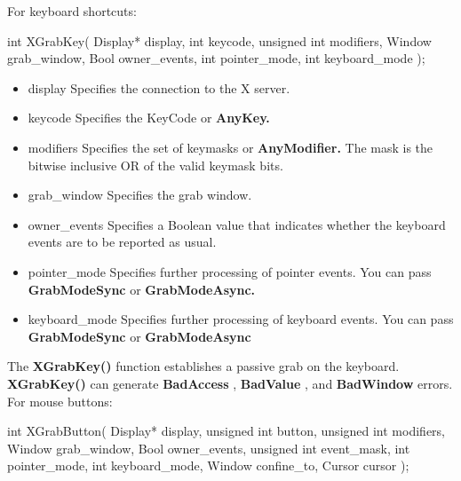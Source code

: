 \documentclass{report}
\begin{document}
\begin{itemize}
            \bigbreak \noindent 
            For keyboard shortcuts:
            \bigbreak \noindent 
            \begin{cppcode}
                int XGrabKey(
                    Display* display,
                    int keycode,
                    unsigned int modifiers,
                    Window grab_window,
                    Bool owner_events,
                    int pointer_mode,
                    int keyboard_mode
                );
            \end{cppcode}
            \bigbreak \noindent
            \begin{itemize}
                \item display	Specifies the connection to the X server.
                \item keycode	Specifies the KeyCode or \textbf{AnyKey.}
                \item modifiers	Specifies the set of keymasks or \textbf{AnyModifier.} The mask is the bitwise inclusive OR of the valid keymask bits.
                \item grab\_window	Specifies the grab window.
                \item owner\_events	Specifies a Boolean value that indicates whether the keyboard events are to be reported as usual.
                \item pointer\_mode	Specifies further processing of pointer events. You can pass \textbf{GrabModeSync} or \textbf{GrabModeAsync.}
                \item keyboard\_mode	Specifies further processing of keyboard events. You can pass \textbf{GrabModeSync} or \textbf{GrabModeAsync}
            \end{itemize}
            The \textbf{XGrabKey()} function establishes a passive grab on the keyboard. \textbf{XGrabKey()} can generate \textbf{BadAccess} , \textbf{BadValue} , and \textbf{BadWindow} errors.
            \bigbreak \noindent 
            For mouse buttons:
            \bigbreak \noindent 
            \begin{cppcode}
                int XGrabButton(
                    Display* display,
                    unsigned int button,
                    unsigned int modifiers,
                    Window grab_window,
                    Bool owner_events,
                    unsigned int event_mask,
                    int pointer_mode,
                    int keyboard_mode,
                    Window confine_to,
                    Cursor cursor
                );
            \end{cppcode}

\end{itemize}
\end{document}
